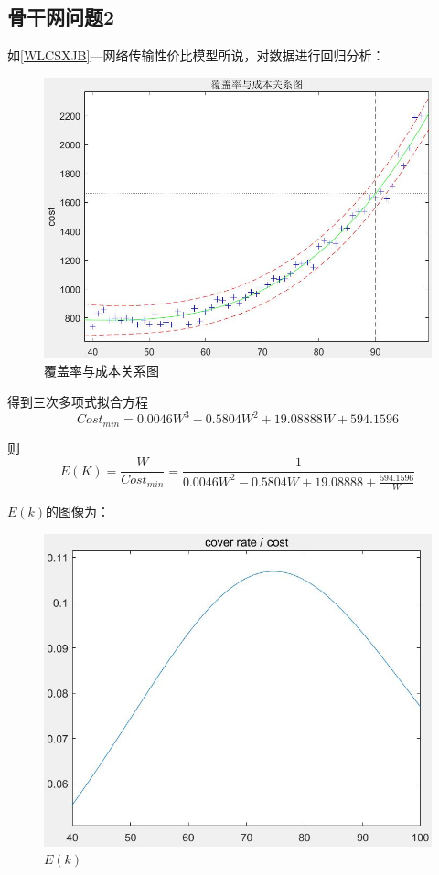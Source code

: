 \documentclass[UTF8,12pt]{ctexart}
\begin{document}
\subsection{骨干网问题2}
如\ref{WLCSXJB}—网络传输性价比模型所说，对数据进行回归分析：
\begin{figure}[H]
    \centering
    \includegraphics[scale=0.6]{cosHG.jpg}   %
    \caption{覆盖率与成本关系图}
\end{figure}
得到三次多项式拟合方程
$$Cost_{min}=0.0046W^3-0.5804W^2+19.08888W+594.1596$$\par
则
$$E(K)=\frac{W}{Cost_{min}}=\frac{1}{0.0046W^2-0.5804W+19.08888+\frac{594.1596}{W}}$$\par
$E(k)$的图像为：
\begin{figure}[H]
    \centering
    \includegraphics[scale=0.6]{cosEK.jpg}   %
    \caption{$E(k)$}
\end{figure}
\end{document}
